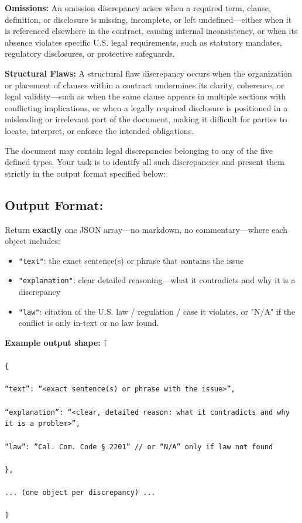 \documentclass[11pt]{article}
\begin{document}
\begin{tcolorbox}[breakable,colback=lightestgray,colframe=black,title=\textbf{Eval\_3 L1: Legal Discrepancy Detection Prompt}]
\textbf{Omissions:}
An omission discrepancy arises when a required term, clause, definition, or disclosure is missing, incomplete, or left undefined—either when it is referenced elsewhere in the contract, causing internal inconsistency, or when its absence violates specific U.S. legal requirements, such as statutory mandates, regulatory disclosures, or protective safeguards.

\textbf{Structural Flaws:}
A structural flaw discrepancy occurs when the organization or placement of clauses within a contract undermines its clarity, coherence, or legal validity—such as when the same clause appears in multiple sections with conflicting implications, or when a legally required disclosure is positioned in a misleading or irrelevant part of the document, making it difficult for parties to locate, interpret, or enforce the intended obligations.

The document may contain legal discrepancies belonging to any of the five defined types. Your task is to identify all such discrepancies and present them strictly in the output format specified below:

\subsection*{\textbf{Output Format:}}
Return \textbf{exactly} one JSON array—no markdown, no commentary—where each object includes:
\begin{itemize}
    \item \texttt{"text"}: the exact sentence(s) or phrase that contains the issue
    \item \texttt{"explanation"}: clear detailed reasoning—what it contradicts and why it is a discrepancy
    \item \texttt{"law"}: citation of the U.S. law / regulation / case it violates, or "N/A" if the conflict is only in-text or no law found.
\end{itemize}

\textbf{Example output shape:}
{\small
\texttt{[\\\\
\{\\\\
``text'': ``<exact sentence(s) or phrase with the issue>'',\\\\
``explanation'': ``<clear, detailed reason: what it contradicts and why it is a problem>'',\\\\
``law'': ``Cal. Com. Code § 2201''  // or ``N/A'' only if law not found\\\\
\},\\\\
... (one object per discrepancy) ...\\\\
]}
}


\end{tcolorbox}
\end{document}
